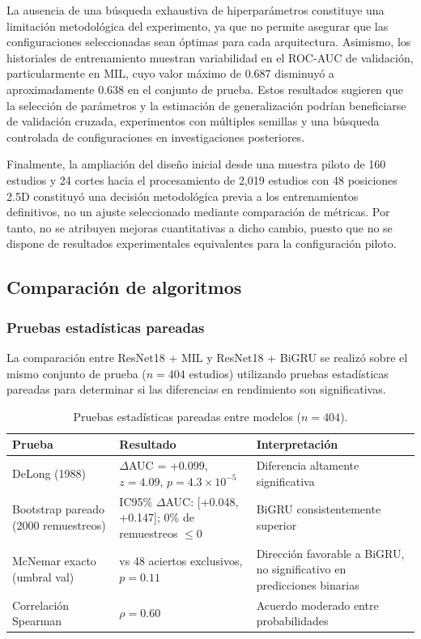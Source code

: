 La ausencia de una búsqueda exhaustiva de hiperparámetros constituye una limitación metodológica del experimento, ya que no permite asegurar que las configuraciones seleccionadas sean óptimas para cada arquitectura. Asimismo, los historiales de entrenamiento muestran variabilidad en el ROC-AUC de validación, particularmente en MIL, cuyo valor máximo de 0.687 disminuyó a aproximadamente 0.638 en el conjunto de prueba. Estos resultados sugieren que la selección de parámetros y la estimación de generalización podrían beneficiarse de validación cruzada, experimentos con múltiples semillas y una búsqueda controlada de configuraciones en investigaciones posteriores.

Finalmente, la ampliación del diseño inicial desde una muestra piloto de 160 estudios y 24 cortes hacia el procesamiento de 2,019 estudios con 48 posiciones 2.5D constituyó una decisión metodológica previa a los entrenamientos definitivos, no un ajuste seleccionado mediante comparación de métricas. Por tanto, no se atribuyen mejoras cuantitativas a dicho cambio, puesto que no se dispone de resultados experimentales equivalentes para la configuración piloto.


\subsection{Comparaci\'on de algoritmos}

\subsubsection*{Pruebas estad\'isticas pareadas}

La comparaci\'on entre ResNet18 + MIL y ResNet18 + BiGRU se realiz\'o sobre el mismo conjunto de prueba ($n = 404$ estudios) utilizando pruebas estad\'isticas pareadas para determinar si las diferencias en rendimiento son significativas.

\begin{table}[H]\centering
\caption{Pruebas estad\'isticas pareadas entre modelos ($n = 404$).}
\small
\begin{tabular}{@{}>{\raggedright\arraybackslash}p{3.6cm}>{\raggedright\arraybackslash}p{5.6cm}>{\raggedright\arraybackslash}p{5.4cm}@{}}
\toprule
\textbf{Prueba} & \textbf{Resultado} & \textbf{Interpretaci\'on} \\
\midrule
DeLong (1988) & $\Delta$AUC = +0.099, $z = 4.09$, $p = 4.3\times10^{-5}$ & Diferencia altamente significativa \\
Bootstrap pareado (2000 remuestreos) & IC95\% $\Delta$AUC: [+0.048, +0.147]; 0\% de remuestreos $\le 0$ & BiGRU consistentemente superior \\
McNemar exacto (umbral val) & 66 vs 48 aciertos exclusivos, $p = 0.11$ & Direcci\'on favorable a BiGRU, no significativo en predicciones binarias \\
Correlaci\'on Spearman & $\rho = 0.60$ & Acuerdo moderado entre probabilidades \\
\bottomrule
\end{tabular}
\end{table}

